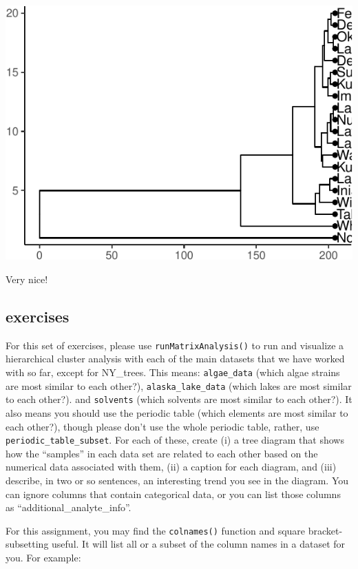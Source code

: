 \documentclass[
]{krantz}
\begin{document}
\begin{center}\includegraphics{index_files/figure-latex/unnamed-chunk-91-1} \end{center}

Very nice!

\hypertarget{exercises-3}{%
\subsection{exercises}\label{exercises-3}}

For this set of exercises, please use \texttt{runMatrixAnalysis()} to run and visualize a hierarchical cluster analysis with each of the main datasets that we have worked with so far, except for NY\_trees. This means: \texttt{algae\_data} (which algae strains are most similar to each other?), \texttt{alaska\_lake\_data} (which lakes are most similar to each other?). and \texttt{solvents} (which solvents are most similar to each other?). It also means you should use the periodic table (which elements are most similar to each other?), though please don't use the whole periodic table, rather, use \texttt{periodic\_table\_subset}. For each of these, create (i) a tree diagram that shows how the ``samples'' in each data set are related to each other based on the numerical data associated with them, (ii) a caption for each diagram, and (iii) describe, in two or so sentences, an interesting trend you see in the diagram. You can ignore columns that contain categorical data, or you can list those columns as ``additional\_analyte\_info''.

For this assignment, you may find the \texttt{colnames()} function and square bracket-subsetting useful. It will list all or a subset of the column names in a dataset for you. For example:
\end{document}
